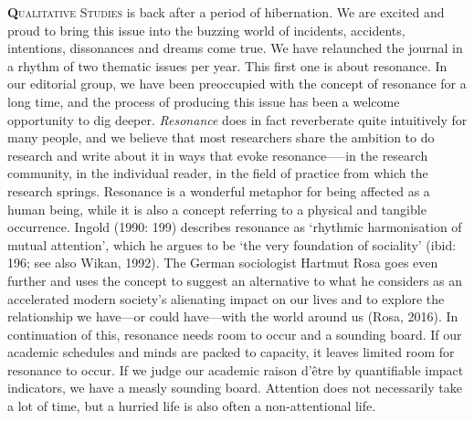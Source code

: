 
\lettrine[lines=2]{\bfseries\color{black}Q}{ualitative Studies} is back after a period of hibernation. We are excited and proud to bring this issue into the buzzing world of incidents, accidents, intentions, dissonances and dreams come true. We have relaunched the journal in a rhythm of two thematic issues per year. This first one is about resonance. In our editorial group, we have been preoccupied with the concept of resonance for a long time, and the process of producing this issue has been a welcome opportunity to dig deeper. \textit{Resonance} does in fact reverberate quite intuitively for many people, and we believe that most researchers share the ambition to do research and write about it in ways that evoke resonance--—in the research community, in the individual reader, in the field of practice from which the research springs. Resonance is a wonderful metaphor for being affected as a human being, while it is also a concept referring to a physical and tangible occurrence. Ingold (1990: 199) describes resonance as ‘rhythmic harmonisation of mutual attention’, which he argues to be ‘the very foundation of sociality’ (ibid: 196; see also Wikan, 1992). The German sociologist Hartmut Rosa goes even further and uses the concept to suggest an alternative to what he considers as an accelerated modern society’s alienating impact on our lives and to explore the relationship we have---or could have--–with the world around us (Rosa, 2016). In continuation of this, resonance needs room to occur and a sounding board. If our academic schedules and minds are packed to capacity, it leaves limited room for resonance to occur. If we judge our academic raison d’être by quantifiable impact indicators, we have a measly sounding board. Attention does not necessarily take a lot of time, but a hurried life is also often a non-attentional life. 
\par
